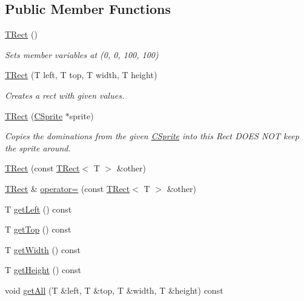 \subsection*{Public Member Functions}
\begin{DoxyCompactItemize}
\item 
\hyperlink{classengine_1_1TRect_a6ac360fa89c33540e1aacf0217bcbff7}{T\-Rect} ()
\begin{DoxyCompactList}\small\item\em Sets member variables at (0, 0, 100, 100) \end{DoxyCompactList}\item 
\hyperlink{classengine_1_1TRect_af74e4c9b5d570438a25c8b92d9b946d4}{T\-Rect} (T left, T top, T width, T height)
\begin{DoxyCompactList}\small\item\em Creates a rect with given values. \end{DoxyCompactList}\item 
\hyperlink{classengine_1_1TRect_a3d400a91242673bf38496a724543f98a}{T\-Rect} (\hyperlink{classengine_1_1CSprite}{C\-Sprite} $\ast$sprite)
\begin{DoxyCompactList}\small\item\em Copies the dominations from the given \hyperlink{classengine_1_1CSprite}{C\-Sprite} into this Rect D\-O\-E\-S N\-O\-T keep the sprite around. \end{DoxyCompactList}\item 
\hyperlink{classengine_1_1TRect_a4a4706672995ba4fabd6be900b58ce1f}{T\-Rect} (const \hyperlink{classengine_1_1TRect}{T\-Rect}$<$ T $>$ \&other)
\item 
\hyperlink{classengine_1_1TRect}{T\-Rect} \& \hyperlink{classengine_1_1TRect_a4ccd990e5432e94ca3b8280cf9c73e0e}{operator=} (const \hyperlink{classengine_1_1TRect}{T\-Rect}$<$ T $>$ \&other)
\item 
T \hyperlink{classengine_1_1TRect_aa813022ee910757ce429aae829023d53}{get\-Left} () const 
\item 
T \hyperlink{classengine_1_1TRect_ae622bc0564f8d15556f32844be907adf}{get\-Top} () const 
\item 
T \hyperlink{classengine_1_1TRect_afe9eb87a07784381d0172cebac589ed0}{get\-Width} () const 
\item 
T \hyperlink{classengine_1_1TRect_ac377947f57b80de2c3c94d21e66e97cf}{get\-Height} () const 
\item 
void \hyperlink{classengine_1_1TRect_a73a225ba48ce45915087fe7a94c2ab1f}{get\-All} (T \&left, T \&top, T \&width, T \&height) const 

\end{DoxyCompactItemize}
